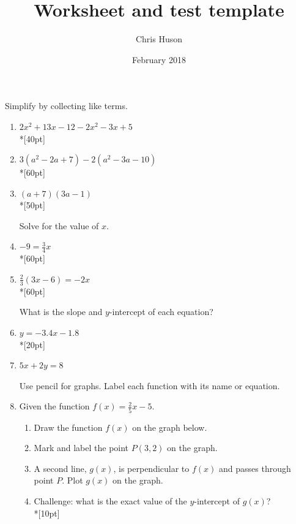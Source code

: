 \documentclass[12pt, oneside]{article}
\title{Worksheet and test template}
\author{Chris Huson}
\date{February 2018}
\begin{document}
Simplify by collecting like terms.

\begin{enumerate}


\item $2x^2+13x -12 -2x^2-3x+5$\\*[40pt]
\item $3(a^2-2a +7) -2(a^2-3a-10)$\\*[60pt]
\item $(a +7)(3a-1)$\\*[50pt]


Solve for the value of $x$.
\item   $-9= \frac{3}{4}x$\\*[60pt]
\item   $\frac{2}{3}(3x-6)=-2x$\\*[60pt]


What is the slope and $y$-intercept of each equation? 
\item   $y=-3.4x-1.8$\\*[20pt]
\item   $5x+2y=8$

\newpage
Use pencil for graphs. Label each function with its name or equation. 
\item Given the function $f(x)=\frac{2}{5}x-5$. 
\begin{enumerate}
    \item Draw the function $f(x)$ on the graph below.
    \item Mark and label the point $P (3, 2)$ on the graph.
    \item A second line, $g(x)$, is perpendicular to $f(x)$ and passes through point $P$. Plot $g(x)$ on the graph.
    \item Challenge: what is the exact value of the $y$-intercept of $g(x)$?\\*[10pt]
\end{enumerate}


\end{enumerate}
\end{document}
